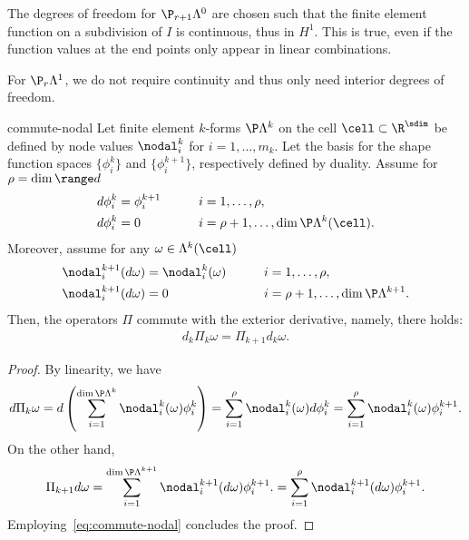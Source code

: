 \begin{remark}
  The degrees of freedom for $\P_{r+1}\Lambda^0$ are chosen such that
  the finite element function on a subdivision of $I$ is continuous,
  thus in $H^1$. This is true, even if the function values at the end
  points only appear in linear combinations.

  For $\P_{r}\Lambda^1$, we do not require continuity
  and thus only need interior degrees of freedom.
\end{remark}

\begin{Lemma}{commute-nodal}
  Let finite element $k$-forms $\P\Lambda^k$ on the cell $\cell\subset\R^\sdim$ be
  defined by node values $\nodal_i^k$ for $i=1,\dots,m_k$. Let the
  basis for the shape function spaces $\{\phi^k_i\}$ and
  $\{\phi^{k+1}_i\}$, respectively defined by duality.  Assume for $\rho=\dim\range d$
  \begin{gather}
    \label{eq:commute-basis}
      \begin{aligned}
          d\phi^k_i &= \phi^{k+1}_i & \qquad i&=1,\dots,\rho,\\
          d\phi^k_i &= 0 & i&=\rho+1,\dots,\dim\P\Lambda^{k}(\cell).
      \end{aligned}
  \end{gather}
Moreover, assume for any $\omega\in \Lambda^k(\cell)$
  \begin{gather}
    \label{eq:commute-nodal}
      \begin{aligned}
      \nodal^{k+1}_i(d \omega) &= \nodal^k_i(\omega)& \qquad i&=1,\dots,\rho,\\
      \nodal^{k+1}_i(d \omega) &= 0 & i&=\rho+1,\dots,\dim\P\Lambda^{k+1}.
      \end{aligned}
  \end{gather}
  Then, the  operators $\Pi$ commute
  with the exterior derivative, namely, there holds:
  \begin{gather}
    d_k \Pi_k \omega = \Pi_{k+1} d_k \omega.
  \end{gather}
\end{Lemma}

\begin{proof}
  By linearity, we have
  \begin{gather}
      d\Pi_k \omega = d\left(\sum_{i=1}^{\dim\P\Lambda^k}\nodal^k_i(\omega) \phi^k_i\right)
      = \sum_{i=1}^{\rho}\nodal^k_i(\omega) d \phi^k_i
      = \sum_{i=1}^{\rho}\nodal^k_i(\omega) \phi^{k+1}_i.
  \end{gather}
  On the other hand,
  \begin{gather}
    \Pi_{k+1} d \omega = \sum_{i=1}^{\dim\P\Lambda^{k+1}}\nodal^{k+1}_i(d \omega) \phi^{k+1}_i.
     = \sum_{i=1}^{\rho}\nodal^{k+1}_i(d \omega) \phi^{k+1}_i.
  \end{gather}
  Employing~\eqref{eq:commute-nodal} concludes the proof.
\end{proof}


